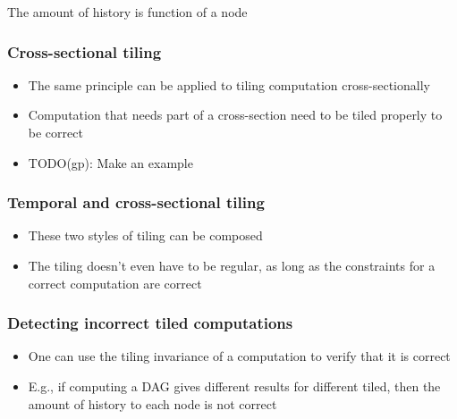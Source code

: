 \documentclass[11pt, reqno]{amsart}
\theoremstyle{definition}
\theoremstyle{remark}
\begin{document}
  The amount of history is function of a node

  \subsubsection{Cross-sectional tiling}

  \begin{itemize}
    \item The same principle can be applied to tiling computation cross-sectionally

    \item Computation that needs part of a cross-section need to be tiled properly
      to be correct

    \item TODO(gp): Make an example
  \end{itemize}

  \subsubsection{Temporal and cross-sectional tiling}

  \begin{itemize}
    \item These two styles of tiling can be composed

    \item The tiling doesn't even have to be regular, as long as the constraints
      for a correct computation are correct
  \end{itemize}

  \subsubsection{Detecting incorrect tiled computations}

  \begin{itemize}
    \item One can use the tiling invariance of a computation to verify that it is
      correct

    \item E.g., if computing a DAG gives different results for different tiled,
      then the amount of history to each node is not correct
  \end{itemize}
\end{document}

